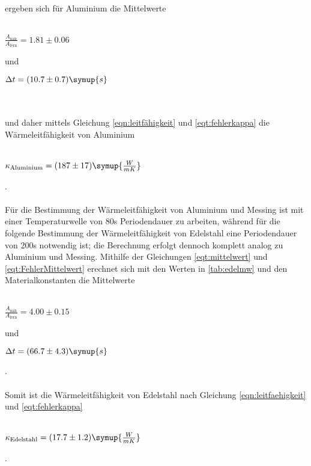 ergeben sich für Aluminium die Mittelwerte
\\ \\
\centerline{$\frac{A_\text{nah}}{A_\text{fern}} = 1.81 \pm 0.06$}
und
\centerline{$\Delta t = (10.7 \pm 0.7) \symup{s}$}
\\ \\
und daher mittels Gleichung \eqref{eqn:leitfähigkeit} und \eqref{eqt:fehlerkappa} die Wärmeleitfähigkeit von Aluminium
\\ \\ 
\centerline{$\kappa_\text{Aluminium} = (187 \pm 17) \symup{\frac{W}{mK}}$}.
\\ \\
Für die Bestimmung der Wärmeleitfähigkeit von Aluminium und Messing ist mit einer Temperaturwelle von 80s Periodendauer zu arbeiten,
während für die folgende Bestimmung der Wärmeleitfähigkeit von Edelstahl eine Periodendauer von 200s notwendig ist; die Berechnung erfolgt
dennoch komplett analog zu Aluminium und Messing.
Mithilfe der Gleichungen \eqref{eqt:mittelwert} und \eqref{eqt:FehlerMittelwert} erechnet sich mit den Werten in \autoref{tab:edelmw} und den Materialkonstanten die Mittelwerte
\\ \\
\centerline{$\frac{A_\text{nah}}{A_\text{fern}} = 4.00 \pm 0.15$}
und
\centerline{$\Delta t = (66.7 \pm 4.3) \symup{s}$}.
\\ \\
Somit ist die Wärmeleitfähigkeit von Edelstahl nach Gleichung \eqref{eqn:leitfaehigkeit} und \eqref{eqt:fehlerkappa}
\\ \\ 
\centerline{$\kappa_\text{Edelstahl} = (17.7 \pm 1.2) \symup{\frac{W}{mK}}$}.
\\ \\






